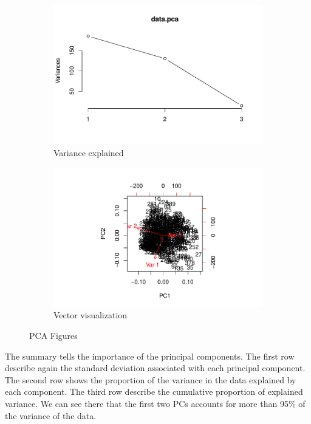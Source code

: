 \documentclass{article}
\begin{document}
      \begin{figure}[htb!]
        \centering
        \begin{subfigure}{.5\textwidth}
          \centering
          \includegraphics[width=1.2\linewidth]{image1.pdf}
          \caption{Variance explained}
          \label{fig:sub1}
        \end{subfigure}%
        \begin{subfigure}{.5\textwidth}
          \centering
          \includegraphics[width=1.2\linewidth]{image2.pdf}
          \caption{Vector visualization}
          \label{fig:sub2}
        \end{subfigure}
        \caption{PCA Figures}
        \label{fig:test}
      \end{figure}

      The summary tells the importance of the principal components. The first row describe again the standard deviation associated with each principal component. The second row shows the proportion of the variance in the data explained by each component. The third row describe the cumulative proportion of explained variance. We can see there that the first two PCs accounts for more than 95\% of the variance of the data.
\end{document}
